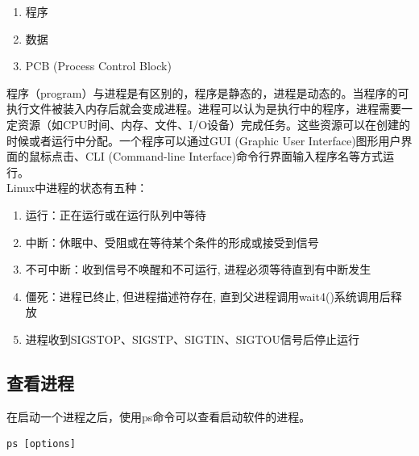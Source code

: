 \documentclass[12pt, openany, oneside]{book}
\begin{document}
\begin{enumerate}
    \item 程序
    \item 数据
    \item PCB (Process Control Block)
\end{enumerate}

程序（program）与进程是有区别的，程序是静态的，进程是动态的。当程序的可执行文件被装入内存后就会变成进程。进程可以认为是执行中的程序，进程需要一定资源（如CPU时间、内存、文件、I/O设备）完成任务。这些资源可以在创建的时候或者运行中分配。一个程序可以通过GUI (Graphic User Interface)图形用户界面的鼠标点击、CLI (Command-line Interface)命令行界面输入程序名等方式运行。\\

Linux中进程的状态有五种：

\begin{enumerate}
    \item 运行：正在运行或在运行队列中等待

    \item 中断：休眠中、受阻或在等待某个条件的形成或接受到信号

    \item 不可中断：收到信号不唤醒和不可运行, 进程必须等待直到有中断发生

    \item 僵死：进程已终止, 但进程描述符存在, 直到父进程调用wait4()系统调用后释放

    \item 进程收到SIGSTOP、SIGSTP、SIGTIN、SIGTOU信号后停止运行
\end{enumerate}

\subsection{查看进程}

在启动一个进程之后，使用ps命令可以查看启动软件的进程。

\vspace{-0.5cm}

\begin{lstlisting}
ps [options]
\end{lstlisting}

\begin{table}[H]
    \centering
    \caption{ps参数说明}
\end{table}
\end{document}
